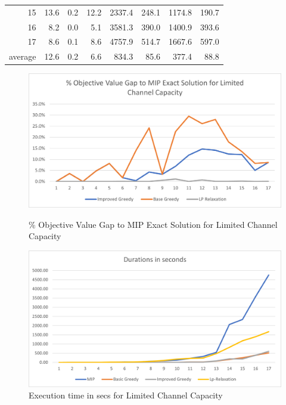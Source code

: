 \documentclass[11pt]{article}
\begin{document}
\begin{table}[htbp]
\begin{adjustbox}{max width=1\textwidth}
\begin{tabular}{|l|rrr|rrrr|}
    \multicolumn{1}{|r|}{15} & 13.6  & 0.2   & 12.2  & 2337.4 & 248.1 & 1174.8 & 190.7 \\
    \multicolumn{1}{|r|}{16} & 8.2   & 0.0   & 5.1   & 3581.3 & 390.0 & 1400.9 & 393.6 \\
    \multicolumn{1}{|r|}{17} & 8.6   & 0.1   & 8.6   & 4757.9 & 514.7 & 1667.6 & 597.0 \\
    \midrule
    average & 12.6  & 0.2   & 6.6   & 834.3 & 85.6  & 377.4 & 88.8 \\
    \bottomrule
    \end{tabular}
  \end{adjustbox}
\end{table}

        \begin{figure}[htb!]
        \centering
        \begin{minipage}{.6\textwidth}
            \centering
            \includegraphics[width=.7\linewidth]{performance_exact_limited_17.png}
            \caption{\% Objective Value Gap to MIP Exact Solution for Limited Channel Capacity}
            \label{fig:fig_value_gap_exact_limited_17}
        \end{minipage}%
        \begin{minipage}{.6\textwidth}
            \centering
            \includegraphics[width=.7\linewidth]{durations_exact_limited_17.png}
            \caption{Execution time in secs for Limited Channel Capacity}
            \label{fig:fig_durations_exact_limited_17}
        \end{minipage}
        \end{figure}
\end{document}
